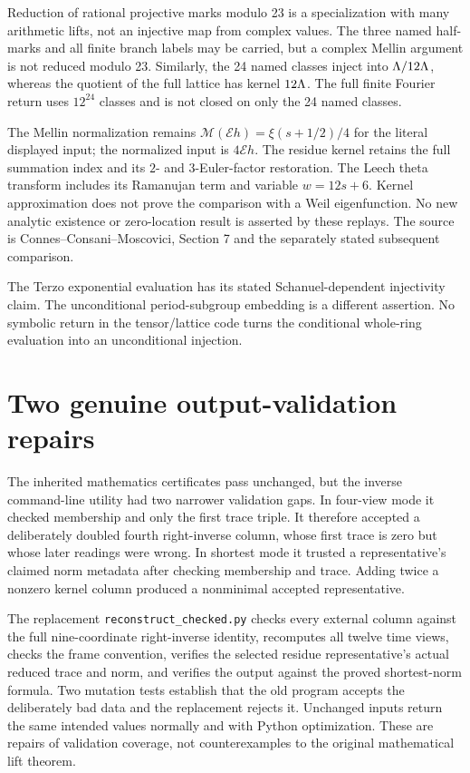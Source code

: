 Reduction of rational projective marks modulo 23 is a specialization with many arithmetic lifts, not an injective map from complex values. The three named half-marks and all finite branch labels may be carried, but a complex Mellin argument is not reduced modulo 23. Similarly, the 24 named classes inject into $\Lambda/12\Lambda$, whereas the quotient of the full lattice has kernel $12\Lambda$. The full finite Fourier return uses $12^{24}$ classes and is not closed on only the 24 named classes.

The Mellin normalization remains $\mathcal M(\mathcal Eh)=\xi(s+1/2)/4$ for the literal displayed input; the normalized input is $4\mathcal Eh$. The residue kernel retains the full summation index and its $2$- and $3$-Euler-factor restoration. The Leech theta transform includes its Ramanujan term and variable $w=12s+6$. Kernel approximation does not prove the comparison with a Weil eigenfunction. No new analytic existence or zero-location result is asserted by these replays. The source is Connes--Consani--Moscovici, Section 7 and the separately stated subsequent comparison.

The Terzo exponential evaluation has its stated Schanuel-dependent injectivity claim. The unconditional period-subgroup embedding is a different assertion. No symbolic return in the tensor/lattice code turns the conditional whole-ring evaluation into an unconditional injection.

\section{Two genuine output-validation repairs}
The inherited mathematics certificates pass unchanged, but the inverse command-line utility had two narrower validation gaps. In four-view mode it checked membership and only the first trace triple. It therefore accepted a deliberately doubled fourth right-inverse column, whose first trace is zero but whose later readings were wrong. In shortest mode it trusted a representative's claimed norm metadata after checking membership and trace. Adding twice a nonzero kernel column produced a nonminimal accepted representative.

The replacement \texttt{reconstruct\_checked.py} checks every external column against the full nine-coordinate right-inverse identity, recomputes all twelve time views, checks the frame convention, verifies the selected residue representative's actual reduced trace and norm, and verifies the output against the proved shortest-norm formula. Two mutation tests establish that the old program accepts the deliberately bad data and the replacement rejects it. Unchanged inputs return the same intended values normally and with Python optimization. These are repairs of validation coverage, not counterexamples to the original mathematical lift theorem.

